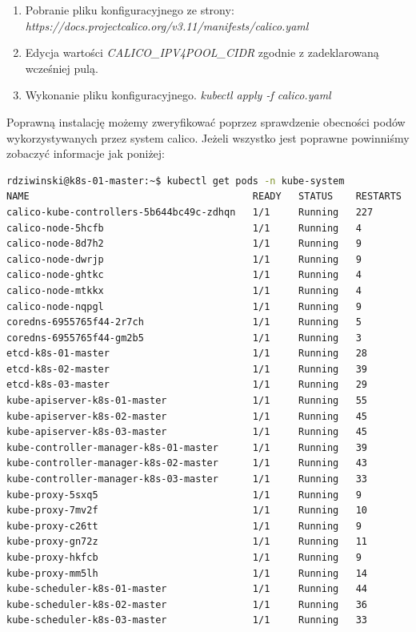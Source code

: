 \documentclass[pl,final,oneside]{mgr} %
\begin{document}
\begin{enumerate}
	\item Pobranie pliku konfiguracyjnego ze strony: \\ \textit{https://docs.projectcalico.org/v3.11/manifests/calico.yaml}
	\item Edycja wartości \textit{CALICO\_IPV4POOL\_CIDR} zgodnie z zadeklarowaną wcześniej pulą.
	\item Wykonanie pliku konfiguracyjnego. \textit{kubectl apply -f calico.yaml}
\end{enumerate}

Poprawną instalację możemy zweryfikować poprzez sprawdzenie obecności podów wykorzystywanych przez system calico. Jeżeli wszystko jest poprawne powinniśmy zobaczyć informacje jak poniżej:
\begin{lstlisting}[language=Bash]
rdziwinski@k8s-01-master:~$ kubectl get pods -n kube-system
NAME                                       READY   STATUS    RESTARTS   AGE
calico-kube-controllers-5b644bc49c-zdhqn   1/1     Running   227        3d21h
calico-node-5hcfb                          1/1     Running   4          3d21h
calico-node-8d7h2                          1/1     Running   9          3d21h
calico-node-dwrjp                          1/1     Running   9          3d21h
calico-node-ghtkc                          1/1     Running   4          3d21h
calico-node-mtkkx                          1/1     Running   4          3d21h
calico-node-nqpgl                          1/1     Running   9          3d21h
coredns-6955765f44-2r7ch                   1/1     Running   5          3d21h
coredns-6955765f44-gm2b5                   1/1     Running   3          3d22h
etcd-k8s-01-master                         1/1     Running   28         7d22h
etcd-k8s-02-master                         1/1     Running   39         7d23h
etcd-k8s-03-master                         1/1     Running   29         7d23h
kube-apiserver-k8s-01-master               1/1     Running   55         7d22h
kube-apiserver-k8s-02-master               1/1     Running   45         7d23h
kube-apiserver-k8s-03-master               1/1     Running   45         7d23h
kube-controller-manager-k8s-01-master      1/1     Running   39         7d22h
kube-controller-manager-k8s-02-master      1/1     Running   43         7d23h
kube-controller-manager-k8s-03-master      1/1     Running   33         7d23h
kube-proxy-5sxq5                           1/1     Running   9          7d22h
kube-proxy-7mv2f                           1/1     Running   10         7d23h
kube-proxy-c26tt                           1/1     Running   9          7d22h
kube-proxy-gn72z                           1/1     Running   11         7d23h
kube-proxy-hkfcb                           1/1     Running   9          7d23h
kube-proxy-mm5lh                           1/1     Running   14         7d23h
kube-scheduler-k8s-01-master               1/1     Running   44         7d22h
kube-scheduler-k8s-02-master               1/1     Running   36         7d23h
kube-scheduler-k8s-03-master               1/1     Running   33         7d23h
\end{lstlisting}
\end{document}
